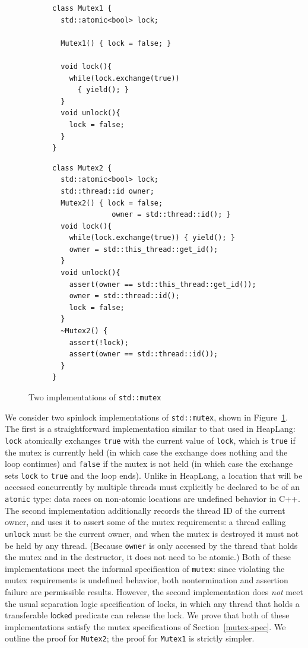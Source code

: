 \begin{figure}[htb]
\centering
\lstset{aboveskip=0pt,belowskip=0pt}
\begin{subfigure}[t]{0.38\textwidth}
\begin{lstlisting}
class Mutex1 {
  std::atomic<bool> lock;

  Mutex1() { lock = false; }

  void lock(){
    while(lock.exchange(true))
      { yield(); }
  }
  void unlock(){
    lock = false;
  }
}
\end{lstlisting}
\end{subfigure}\hfill
\begin{subfigure}[t]{0.60\textwidth}
\begin{lstlisting}
class Mutex2 {
  std::atomic<bool> lock;
  std::thread::id owner;
  Mutex2() { lock = false;
              owner = std::thread::id(); }
  void lock(){
    while(lock.exchange(true)) { yield(); }
    owner = std::this_thread::get_id();
  }
  void unlock(){
    assert(owner == std::this_thread::get_id());
    owner = std::thread::id();
    lock = false;
  }
  ~Mutex2() {
    assert(!lock);
    assert(owner == std::thread::id());
  }
}
\end{lstlisting}
\end{subfigure}
\caption{Two implementations of \lstinline{std::mutex}}
\label{mutex-impl}
\end{figure}

We consider two spinlock implementations of \lstinline{std::mutex}, shown in Figure~\ref{mutex-impl}. The first is a straightforward implementation similar to that used in HeapLang: \lstinline{lock} atomically exchanges \lstinline{true} with the current value of \lstinline{lock}, which is \lstinline{true} if the mutex is currently held (in which case the exchange does nothing and the loop continues) and \lstinline{false} if the mutex is not held (in which case the exchange sets \lstinline{lock} to \lstinline{true} and the loop ends). Unlike in HeapLang, a location that will be accessed concurrently by multiple threads must explicitly be declared to be of an \lstinline{atomic} type: data races on non-atomic locations are undefined behavior in C++. The second implementation additionally records the thread ID of the current owner, and uses it to assert some of the mutex requirements: a thread calling \lstinline{unlock} must be the current owner, and when the mutex is destroyed it must not be held by any thread. (Because \lstinline{owner} is only accessed by the thread that holds the mutex and in the destructor, it does not need to be atomic.) Both of these implementations meet the informal specification of \lstinline{mutex}: since violating the mutex requirements is undefined behavior, both nontermination and assertion failure are permissible results. However, the second implementation does \emph{not} meet the usual separation logic specification of locks, in which any thread that holds a transferable $\mathsf{locked}$ predicate can release the lock. We prove that both of these implementations satisfy the mutex specifications of Section~\ref{mutex-spec}. We outline the proof for \lstinline{Mutex2}; the proof for \lstinline{Mutex1} is strictly simpler.

